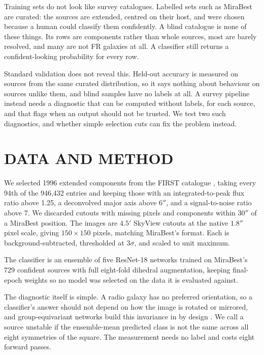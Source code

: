 \documentclass{aastex701}
\begin{document}
Training sets do not look like survey catalogues. Labelled sets such as MiraBest
\citep{porter2023} are curated: the sources are extended, centred on their host, and were
chosen because a human could classify them confidently. A blind catalogue is none of these
things. Its rows are components rather than whole sources, most are barely resolved, and
many are not FR galaxies at all. A classifier still returns a confident-looking probability
for every row.

Standard validation does not reveal this. Held-out accuracy is measured on sources from the
same curated distribution, so it says nothing about behaviour on sources unlike them, and
blind samples have no labels at all. A survey pipeline instead needs a diagnostic that can
be computed without labels, for each source, and that flags when an output should not be
trusted. We test two such diagnostics, and whether simple selection cuts can fix the problem
instead.

\section{DATA AND METHOD}

We selected 1996 extended components from the FIRST catalogue
\citep{becker1995,helfand2015}, taking every 94th of the 946,432 entries and keeping those
with an integrated-to-peak flux ratio above 1.25, a deconvolved major axis above
$6''$, and a signal-to-noise ratio above 7. We discarded cutouts with missing pixels and
components within $30''$ of a MiraBest position. The images are $4.5'$ SkyView cutouts
\citep{mcglynn1998} at the native $1.8''$ pixel scale, giving $150 \times 150$ pixels,
matching MiraBest's format. Each is background-subtracted, thresholded at $3\sigma$, and
scaled to unit maximum.

The classifier is an ensemble of five ResNet-18 networks \citep{he2016} trained on
MiraBest's 729 confident sources with full eight-fold dihedral augmentation, keeping
final-epoch weights so no model was selected on the data it is evaluated against.

The diagnostic itself is simple. A radio galaxy has no preferred orientation, so a
classifier's answer should not depend on how the image is rotated or mirrored, and
group-equivariant networks build this invariance in by design \citep{scaife2021}. We call a
source unstable if the ensemble-mean predicted class is not the same across all eight
symmetries of the square. The measurement needs no label and costs eight forward passes.
\end{document}
